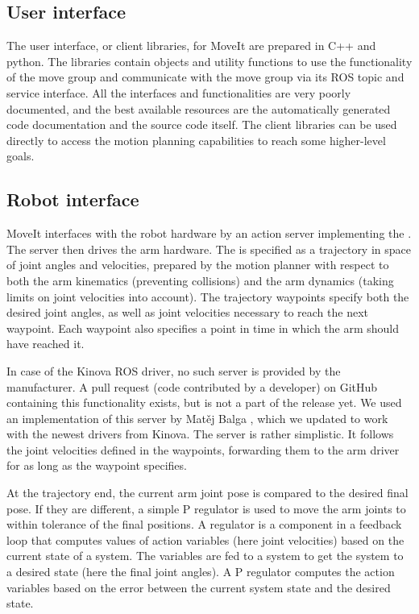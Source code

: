 \documentclass[buriama8_dp.tex]{subfiles}
\begin{document}
\subsection{User interface}
\label{subsec:moveit_ui}

The user interface, or client libraries, for MoveIt are prepared in C++ and python. The libraries contain objects and utility functions to use the functionality of the move group and communicate with the move group via its ROS topic and service interface. All the interfaces and functionalities are very poorly documented, and the best available resources are the automatically generated code documentation and the source code itself. The client libraries can be used directly to access the motion planning capabilities to reach some higher-level goals.


\subsection{Robot interface}
\label{subsec:moveit_ri}

MoveIt interfaces with the robot hardware by an action server implementing the . The server then drives the arm hardware. The  is specified as a trajectory in space of joint angles and velocities, prepared by the motion planner with respect to both the arm kinematics (preventing collisions) and the arm dynamics (taking limits on joint velocities into account). The trajectory waypoints specify both the desired joint angles, as well as joint velocities necessary to reach the next waypoint. Each waypoint also specifies a point in time in which the arm should have reached it.

In case of the Kinova ROS driver, no such server is provided by the manufacturer. A pull request (code contributed by a developer) on GitHub containing this functionality exists, but is not a part of the release yet. We used an implementation of this server by Matěj Balga \cite{matej} , which we updated to work with the newest drivers from Kinova. The server is rather simplistic. It follows the joint velocities defined in the waypoints, forwarding them to the arm driver for as long as the waypoint specifies.

At the trajectory end, the current arm joint pose is compared to the desired final pose. If they are different, a simple P regulator is used to move the arm joints to within tolerance of the final positions. A regulator is a component in a feedback loop that computes values of action variables (here joint velocities) based on the current state of a system. The variables are fed to a system to get the system to a desired state (here the final joint angles). A P regulator computes the action variables based on the error between the current system state and the desired state.
\end{document}
